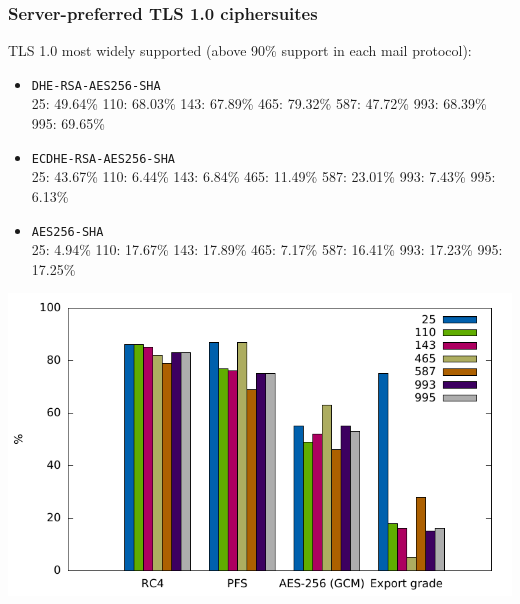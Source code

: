\documentclass[14pt,aspectratio=43]{beamer}
\begin{document}
\begin{frame}
  \frametitle{Server-preferred TLS 1.0 ciphersuites}
  TLS 1.0 most widely supported (above 90\% support in each mail protocol):
  \begin{itemize}
    \item \texttt{DHE-RSA-AES256-SHA}\\ \small{25: 49.64\% 110: 68.03\% 143:  67.89\% 465: 79.32\% 587: 47.72\%  993: 68.39\% 995: 69.65\%} 
    \item \texttt{ECDHE-RSA-AES256-SHA}\\ \small{25: 43.67\% 110: 6.44\% 143: 6.84\% 465: 11.49\% 587: 23.01\% 993: 7.43\% 995: 6.13\%}
    \item \texttt{AES256-SHA}\\ \small{25: 4.94\% 110: 17.67\% 143: 17.89\% 465: 7.17\% 587: 16.41\% 993: 17.23\% 995: 17.25\%}
  \end{itemize}
\end{frame}

\begin{frame}
  \begin{center}
    \includegraphics*[scale=0.8]{images/plot-selected-primitives.pdf}
  \end{center}
\end{frame}
\end{document}
